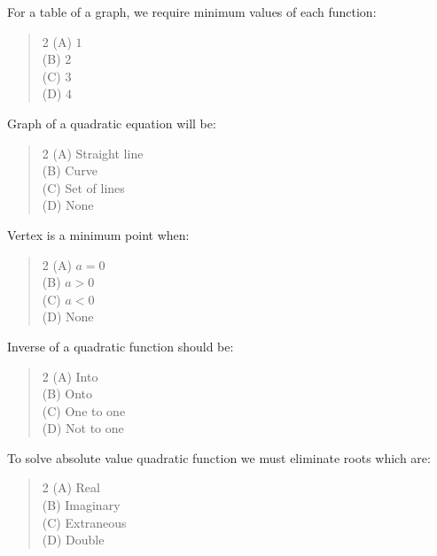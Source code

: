 \documentclass[11pt,a4paper]{article}
\begin{document}
\begin{mcqlist}
\item For a table of a graph, we require minimum values of each function:
\begin{quote}\begin{multicols}{2}
\noindent (A) $1$ \\
(B) $2$ \\
(C) $3$ \\
(D) $4$
\end{multicols}\end{quote}

\item Graph of a quadratic equation will be:
\begin{quote}\begin{multicols}{2}
\noindent (A) Straight line \\
(B) Curve \\
(C) Set of lines \\
(D) None
\end{multicols}\end{quote}

\item Vertex is a minimum point when:
\begin{quote}\begin{multicols}{2}
\noindent (A) $a=0$ \\
(B) $a>0$ \\
(C) $a<0$ \\
(D) None
\end{multicols}\end{quote}

\item Inverse of a quadratic function should be:
\begin{quote}\begin{multicols}{2}
\noindent (A) Into \\
(B) Onto \\
(C) One to one \\
(D) Not to one
\end{multicols}\end{quote}

\item To solve absolute value quadratic function we must eliminate roots which are:
\begin{quote}\begin{multicols}{2}
\noindent (A) Real \\
(B) Imaginary \\
(C) Extraneous \\
(D) Double
\end{multicols}\end{quote}


\end{mcqlist}
\end{document}
